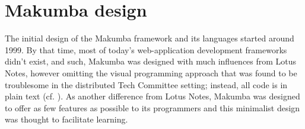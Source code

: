\documentclass{llncs}
\begin{document}




\section{Makumba design}\label{sec:makumba}

The initial design of the Makumba framework and its languages started around 1999. By that time, most of today's web-application development frameworks didn't exist, and such, Makumba was designed with much influences from Lotus Notes, however omitting the visual programming approach that was found to be troublesome in the distributed Tech Committee setting; instead, all code is in plain text (cf. \cite{yamauchi00}). As another difference from Lotus Notes, Makumba was designed to offer as few features as possible to its programmers and this minimalist design was thought to facilitate learning. 
\end{document}
